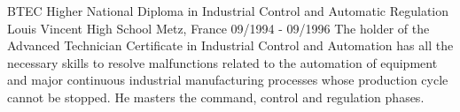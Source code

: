 \begin{cventries}
  \cventry
    {BTEC Higher National Diploma in Industrial Control and Automatic Regulation}
    {Louis Vincent High School} %
    {Metz, France} %
    {09/1994 - 09/1996}
    {
      The holder of the Advanced Technician Certificate in Industrial Control and Automation has all the necessary skills to resolve malfunctions related to the automation of equipment and major continuous industrial manufacturing processes whose production cycle cannot be stopped. He masters the command, control and regulation phases. 
    }

\end{cventries}
